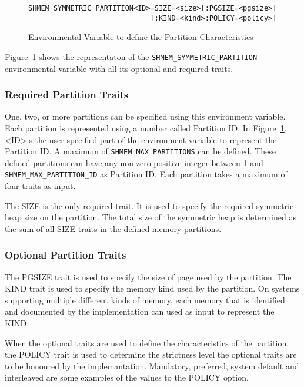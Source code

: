 \begin{figure}
    \lstset{language=c,
            keywordstyle=\bfseries,
            basicstyle=\tt\small,
            frame=single}
    \begin{lstlisting}
SHMEM_SYMMETRIC_PARTITION<ID>=SIZE=<size>[:PGSIZE=<pgsize>]
                             [:KIND=<kind>:POLICY=<policy>]
    \end{lstlisting}
    \caption{Environmental Variable to define the Partition
    Characteristics}
    \label{fig:env}
\end{figure}
Figure~\ref{fig:env} shows the representaton of the
\texttt{SHMEM\_SYMMETRIC\_PARTITION} environmental variable with
all its optional and required traits.

\subsubsection{Required Partition Traits}
\label{src:smempart/req}
One, two, or more partitions
can be specified using this environment variable. Each partition is
represented using a number called Partition ID. In
Figure~\ref{fig:env},\textless ID\textgreater is the user-specified
part of the environment variable to represent the Partition ID. A
maximum of \texttt{SHMEM\_MAX\_PARTITIONS} can be defined. These
defined partitions can have any non-zero positive integer between
1 and \texttt{SHMEM\_MAX\_PARTITION\_ID} as Partition ID. Each
partition takes a maximum of four traits as input.

The SIZE is the only required trait. It is used to specify the required
symmetric heap size on the partition. The total size of the symmetric heap
is determined as the sum of all SIZE traits in the defined memory
partitions.

\subsubsection{Optional Partition Traits}
\label{src:smempart/optional}
The PGSIZE trait is used to specify the size of page used by the partition.
The KIND trait is used to specify the memory kind used by the partition.
On systems supporting multiple different kinds of memory, each memory
that is identified and documented by the implementation can used as input
to represent the KIND.

When the optional traits are used to define the characteristics of the
partition, the POLICY trait is used to determine the strictness level
the optional traits are to be honoured by the implemantation. Mandatory,
preferred, system default and interleaved are some examples of the
values to the POLICY option.

